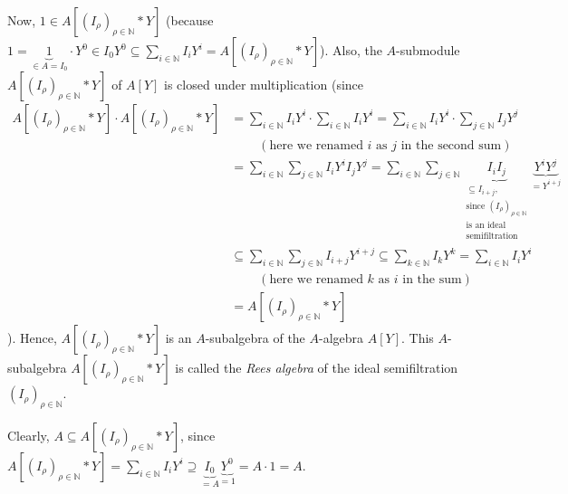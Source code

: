\documentclass[12pt,final,notitlepage,onecolumn]{article}%
\begin{document}
Now, $1\in A\left[  \left(  I_{\rho}\right)  _{\rho\in\mathbb{N}}\ast
Y\right]  $ (because $1=\underbrace{1}_{\in A=I_{0}}\cdot Y^{0}\in I_{0}%
Y^{0}\subseteq\sum\limits_{i\in\mathbb{N}}I_{i}Y^{i}=A\left[  \left(  I_{\rho
}\right)  _{\rho\in\mathbb{N}}\ast Y\right]  $). Also, the $A$-submodule
$A\left[  \left(  I_{\rho}\right)  _{\rho\in\mathbb{N}}\ast Y\right]  $ of
$A\left[  Y\right]  $ is closed under multiplication (since%
\begin{align*}
A\left[  \left(  I_{\rho}\right)  _{\rho\in\mathbb{N}}\ast Y\right]  \cdot
A\left[  \left(  I_{\rho}\right)  _{\rho\in\mathbb{N}}\ast Y\right]   &
=\sum\limits_{i\in\mathbb{N}}I_{i}Y^{i}\cdot\sum\limits_{i\in\mathbb{N}}%
I_{i}Y^{i}=\sum\limits_{i\in\mathbb{N}}I_{i}Y^{i}\cdot\sum\limits_{j\in
\mathbb{N}}I_{j}Y^{j}\\
&  \ \ \ \ \ \ \ \ \ \ \left(  \text{here we renamed }i\text{ as }j\text{ in
the second sum}\right) \\
&  =\sum\limits_{i\in\mathbb{N}}\sum\limits_{j\in\mathbb{N}}I_{i}Y^{i}%
I_{j}Y^{j}=\sum\limits_{i\in\mathbb{N}}\sum\limits_{j\in\mathbb{N}%
}\underbrace{I_{i}I_{j}}_{\substack{\subseteq I_{i+j},\\\text{since }\left(
I_{\rho}\right)  _{\rho\in\mathbb{N}}\\\text{is an ideal}%
\\\text{semifiltration}}}\underbrace{Y^{i}Y^{j}}_{=Y^{i+j}}\\
&  \subseteq\sum\limits_{i\in\mathbb{N}}\sum\limits_{j\in\mathbb{N}}%
I_{i+j}Y^{i+j}\subseteq\sum_{k\in\mathbb{N}}I_{k}Y^{k}=\sum\limits_{i\in
\mathbb{N}}I_{i}Y^{i}\\
&  \ \ \ \ \ \ \ \ \ \ \left(  \text{here we renamed }k\text{ as }i\text{ in
the sum}\right) \\
&  =A\left[  \left(  I_{\rho}\right)  _{\rho\in\mathbb{N}}\ast Y\right]
\end{align*}
). Hence, $A\left[  \left(  I_{\rho}\right)  _{\rho\in\mathbb{N}}\ast
Y\right]  $ is an $A$-subalgebra of the $A$-algebra $A\left[  Y\right]  $.
This $A$-subalgebra $A\left[  \left(  I_{\rho}\right)  _{\rho\in\mathbb{N}%
}\ast Y\right]  $ is called the \textit{Rees algebra} of the ideal
semifiltration $\left(  I_{\rho}\right)  _{\rho\in\mathbb{N}}$.

Clearly, $A\subseteq A\left[  \left(  I_{\rho}\right)  _{\rho\in\mathbb{N}%
}\ast Y\right]  $, since $A\left[  \left(  I_{\rho}\right)  _{\rho
\in\mathbb{N}}\ast Y\right]  =\sum\limits_{i\in\mathbb{N}}I_{i}Y^{i}%
\supseteq\underbrace{I_{0}}_{=A}\underbrace{Y^{0}}_{=1}=A\cdot1=A$.
\end{document}
